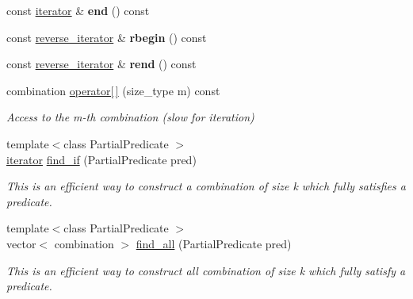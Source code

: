 \begin{DoxyCompactItemize}
\item 
\hypertarget{classdscr_1_1basic__combinations_a363123791c4628aac82efd5f07258aa4}{const \hyperlink{classdscr_1_1basic__combinations_1_1iterator}{iterator} \& {\bfseries end} () const }\label{classdscr_1_1basic__combinations_a363123791c4628aac82efd5f07258aa4}

\item 
\hypertarget{classdscr_1_1basic__combinations_a702fb964db92de71732119a2931f9660}{const \hyperlink{classdscr_1_1basic__combinations_1_1reverse__iterator}{reverse\-\_\-iterator} \& {\bfseries rbegin} () const }\label{classdscr_1_1basic__combinations_a702fb964db92de71732119a2931f9660}

\item 
\hypertarget{classdscr_1_1basic__combinations_a686ea9a981e7119b04e944649bd92d5d}{const \hyperlink{classdscr_1_1basic__combinations_1_1reverse__iterator}{reverse\-\_\-iterator} \& {\bfseries rend} () const }\label{classdscr_1_1basic__combinations_a686ea9a981e7119b04e944649bd92d5d}

\item 
combination \hyperlink{classdscr_1_1basic__combinations_a6e064851e71942f39ada8e5d669df441}{operator\mbox{[}$\,$\mbox{]}} (size\-\_\-type m) const 
\begin{DoxyCompactList}\small\item\em Access to the m-\/th combination (slow for iteration) \end{DoxyCompactList}\item 
{\footnotesize template$<$class Partial\-Predicate $>$ }\\\hyperlink{classdscr_1_1basic__combinations_1_1iterator}{iterator} \hyperlink{classdscr_1_1basic__combinations_ae14b7a1e2f723a7697402d69e8bb1095}{find\-\_\-if} (Partial\-Predicate pred)
\begin{DoxyCompactList}\small\item\em This is an efficient way to construct a combination of size k which fully satisfies a predicate. \end{DoxyCompactList}\item 
{\footnotesize template$<$class Partial\-Predicate $>$ }\\vector$<$ combination $>$ \hyperlink{classdscr_1_1basic__combinations_a3f536b237cc48cdf74a85de956201233}{find\-\_\-all} (Partial\-Predicate pred)
\begin{DoxyCompactList}\small\item\em This is an efficient way to construct all combination of size k which fully satisfy a predicate. \end{DoxyCompactList}\end{DoxyCompactItemize}
